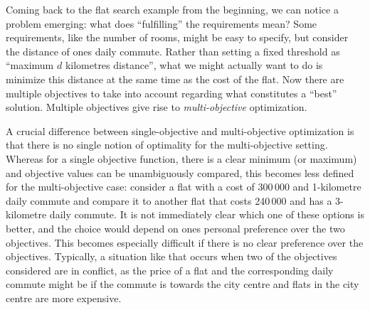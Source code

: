 Coming back to the flat search example from the beginning, we can notice a problem emerging:
what does ``fulfilling'' the requirements mean?
Some requirements, like the number of rooms, might be easy to specify, but consider the distance of ones daily commute.
Rather than setting a fixed threshold as ``maximum $d$ kilometres distance'', what we might actually want to do is minimize this distance at the same time as the cost of the flat.
Now there are multiple objectives to take into account regarding what constitutes a ``best'' solution.
Multiple objectives give rise to \emph{multi-objective} optimization.

A crucial difference between single-objective and multi-objective optimization is that there is no single notion of optimality for the multi-objective setting.
Whereas for a single objective function, there is a clear minimum (or maximum) and objective values can be unambiguously compared, this becomes less defined for the multi-objective case:
consider a flat with a cost of 300\,000 \texteuro{} and 1-kilometre daily commute and compare it to another flat that costs 240\,000 \texteuro{} and has a 3-kilometre daily commute.
It is not immediately clear which one of these options is better, and the choice would depend on ones personal preference over the two objectives.
This becomes especially difficult if there is no clear preference over the objectives.
Typically, a situation like that occurs when two of the objectives considered are in conflict, as the price of a flat and the corresponding daily commute might be if the commute is towards the city centre and flats in the city centre are more expensive.

